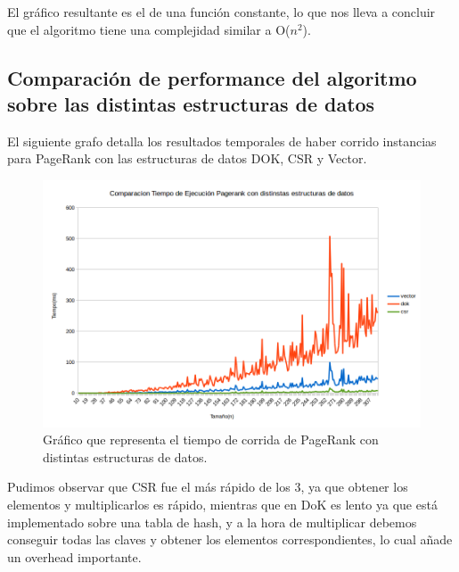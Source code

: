 El gráfico resultante es el de una función constante, lo que nos lleva a concluir que el algoritmo tiene una complejidad similar a O($n^{2}$).

\subsection{Comparación de performance del algoritmo sobre las distintas estructuras de datos}

El siguiente grafo detalla los resultados temporales de haber corrido instancias para PageRank con las estructuras de datos DOK, CSR y Vector.

\begin{figure}[h]
  \includegraphics[scale=0.4]{imagenes/comparacion-tiempo-ejecucion-csr-dok-vector.png}
   \caption{Gráfico que representa el tiempo de corrida de PageRank con distintas estructuras de datos.}
  \label{fig:img1}
\end{figure}

Pudimos observar que CSR fue el más rápido de los 3, ya que obtener los elementos y multiplicarlos es rápido, mientras que en DoK es lento ya que está implementado sobre una tabla de hash, y a la hora de multiplicar debemos conseguir todas las claves y obtener los elementos correspondientes, lo cual añade un overhead importante.